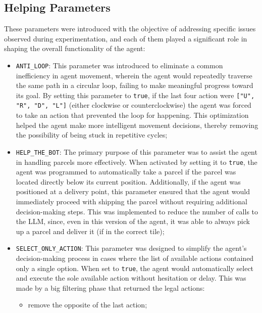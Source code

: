 \subsection{Helping Parameters}
These parameters were introduced with the objective of addressing specific
issues observed during experimentation, and each of them played a significant role
in shaping the overall functionality of the agent:
\begin{itemize}
  \item \texttt{ANTI\_LOOP}: This parameter was introduced to eliminate a common
    inefficiency in agent movement, wherein the agent would repeatedly traverse
    the same path in a circular loop, failing to make meaningful progress toward
    its goal. By setting this parameter to \texttt{true}, if the last four
    action were \texttt{["U", "R", "D", "L"]} (either clockwise or
    counterclockwise) the agent was forced to take an action that prevented the loop
    for happening. This optimization helped the agent make more intelligent
    movement decisions, thereby removing the possibility of being stuck in repetitive
    cycles;

  \item \texttt{HELP\_THE\_BOT}: The primary purpose of this parameter was to assist
    the agent in handling parcels more effectively. When activated by setting it
    to \texttt{true}, the agent was programmed to automatically take a parcel if
    the parcel was located directly below its current position. Additionally, if
    the agent was positioned at a delivery point, this parameter ensured that the
    agent would immediately proceed with shipping the parcel without requiring additional
    decision-making steps. This was implemented to reduce the number of calls to
    the LLM, since, even in this version of the agent, it was able to always pick
    up a parcel and deliver it (if in the correct tile);

  \item \texttt{SELECT\_ONLY\_ACTION}: This parameter was designed to simplify the
    agent's decision-making process in cases where the list of available actions
    contained only a single option. When set to \texttt{true}, the agent would
    automatically select and execute the sole available action without
    hesitation or delay. This was made by a big filtering phase that returned the
    legal actions:
    \begin{itemize}
      \item remove the opposite of the last action;


\end{itemize}
\end{itemize}
